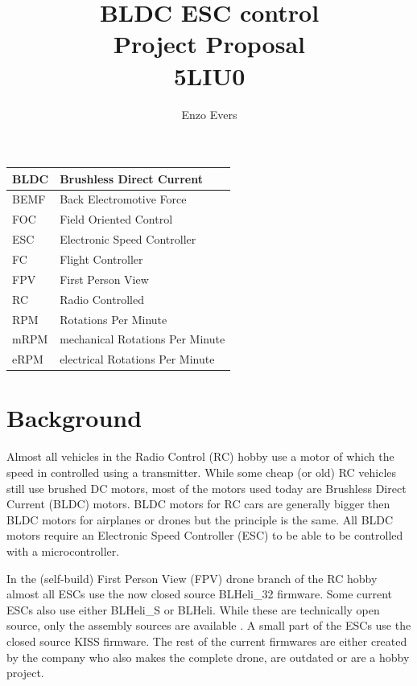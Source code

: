 \documentclass[]{report}
\title{	\huge BLDC ESC control \\
		\large Project Proposal \\ 5LIU0}
\author{Enzo Evers}
\begin{document}
\maketitle
\tableofcontents

\newpage

\begin{tabular}{|l|l|}
	\hline
	BLDC & Brushless Direct Current \\
	\hline
	BEMF & Back Electromotive Force \\
	\hline
	FOC & Field Oriented Control \\
	\hline
	ESC & Electronic Speed Controller \\
	\hline
	FC & Flight Controller \\
	\hline
	FPV & First Person View \\
	\hline
	RC & Radio Controlled \\
	\hline
	RPM & Rotations Per Minute \\
	\hline
	mRPM & mechanical Rotations Per Minute \\
	\hline
	eRPM & electrical Rotations Per Minute \\
	\hline
\end{tabular}

\newpage

\chapter{Background}
Almost all vehicles in the Radio Control (RC) hobby use a motor of which the speed in controlled using a transmitter. While some cheap (or old) RC vehicles still use brushed DC motors, most of the motors used today are Brushless Direct Current (BLDC) motors. BLDC motors for RC cars are generally bigger then BLDC motors for airplanes or drones but the principle is the same. All BLDC motors require an Electronic Speed Controller (ESC) to be able to be controlled with a microcontroller.

In the (self-build) First Person View (FPV) drone branch of the RC hobby almost all ESCs use the now closed source BLHeli\_32 \cite{BLHeli_Git} firmware. Some current ESCs also use either BLHeli\_S or BLHeli. While these are technically open source, only the assembly sources are available \cite{BLHeli_Git}. A small part of the ESCs use the closed source KISS \cite{KISS_website} firmware. The rest of the current firmwares are either created by the company who also makes the complete drone, are outdated  or are a hobby project.
\end{document}
